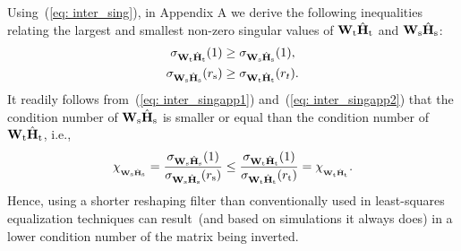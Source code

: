\documentclass[twocolumn]{bmcart}%
\begin{document}
Using~(\ref{eq: inter_sing}), in Appendix A we derive the following inequalities relating the largest and smallest non-zero singular values of $\mathbf{W}_{\rm t}\hat{\mathbf{H}}_{\rm t}$ and $\mathbf{W}_{\rm s}\hat{\mathbf{H}}_{\rm s}$:
\begin{align}
\label{eq: inter_singapp1}
  \sigma_{\mathbf{W}_{\rm t}\hat{\mathbf{H}}_{\rm t}}(1) & \geq \sigma_{\mathbf{W}_{\rm s}\hat{\mathbf{H}}_{\rm s}}(1), \\
  \label{eq: inter_singapp2}
  \sigma_{\mathbf{W}_{\rm s}\hat{\mathbf{H}}_{\rm s}}(r_{\rm s}) & \geq \sigma_{\mathbf{W}_{\rm t}\hat{\mathbf{H}}_{\rm t}}(r_t).
\end{align}
It readily follows from~(\ref{eq: inter_singapp1}) and~(\ref{eq: inter_singapp2}) that the condition number of $\mathbf{W}_{\rm s}\hat{\mathbf{H}}_{\rm s}$ is smaller or equal than the condition number of $\mathbf{W}_{\rm t}\hat{\mathbf{H}}_{\rm t}$, i.e.,
\begin{equation}
\chi_{_{\mathbf{W}_{\rm s}\hat{\mathbf{H}}_{\rm s}}} = \frac{\sigma_{\mathbf{W}_{\rm s}\hat{\mathbf{H}}_{\rm s}}(1)}{\sigma_{\mathbf{W}_{\rm s}\hat{\mathbf{H}}_{\rm s}}(r_{\rm s})} \leq \frac{\sigma_{\mathbf{W}_{\rm t}\hat{\mathbf{H}}_{\rm t}}(1)}{\sigma_{\mathbf{W}_{\rm t}\hat{\mathbf{H}}_{\rm t}}(r_{\rm t})} = \chi_{_{\mathbf{W}_{\rm t}\hat{\mathbf{H}}_{\rm t}}}.
\end{equation}
Hence, using a shorter reshaping filter than conventionally used in least-squares equalization techniques can result~(and based on simulations it always does) in a lower condition number of the matrix being inverted.
\end{document}
